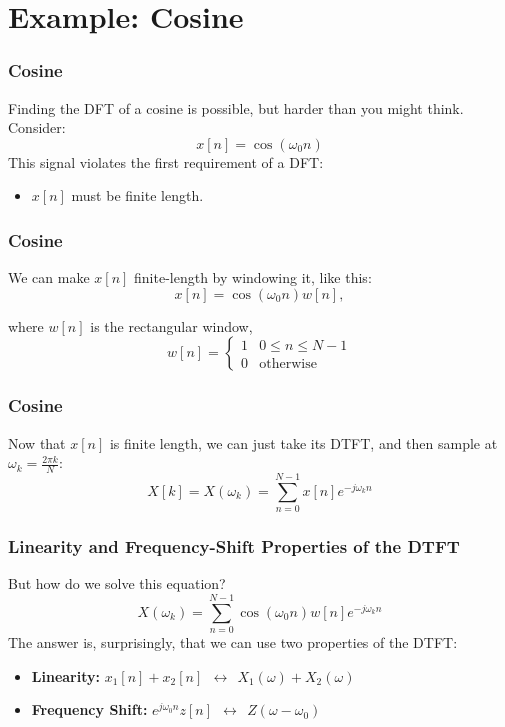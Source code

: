 \documentclass{beamer}
\begin{document}
\section[Cosine]{Example: Cosine}
\setcounter{subsection}{1}

\begin{frame}
  \frametitle{Cosine}

  Finding the DFT of a cosine is possible, but harder than you might think.
  Consider:
  \begin{displaymath}
    x[n] = \cos(\omega_0 n)
  \end{displaymath}
  This signal violates the first requirement of a DFT:
  \begin{itemize}
  \item $x[n]$ must be finite length.
  \end{itemize}
\end{frame}

\begin{frame}
  \frametitle{Cosine}

  We can make $x[n]$ finite-length by windowing it, like this:
  \begin{displaymath}
    x[n] = \cos(\omega_0 n)w[n],
  \end{displaymath}

  where $w[n]$ is the rectangular window,
  \begin{displaymath}
    w[n] =\begin{cases}
    1 & 0\le n \le N-1\\
    0 & \mbox{otherwise}
    \end{cases}
  \end{displaymath}
\end{frame}

\begin{frame}
  \frametitle{Cosine}

  Now that $x[n]$ is finite length, we can just take its DTFT, and
  then sample at $\omega_k=\frac{2\pi k}{N}$:
  \begin{displaymath}
    X[k] = X(\omega_k) = \sum_{n=0}^{N-1} x[n]e^{-j\omega_k n}
  \end{displaymath}

\end{frame}

\begin{frame}
  \frametitle{Linearity and Frequency-Shift Properties of the DTFT}

  But how do we solve this equation?
  \begin{displaymath}
    X(\omega_k) = \sum_{n=0}^{N-1} \cos(\omega_0 n)w[n] e^{-j\omega_k n}
  \end{displaymath}
  The answer is, surprisingly, that we can use two properties of the
  DTFT:
  \begin{itemize}
  \item {\bf Linearity:} $x_1[n]+x_2[n]~~\leftrightarrow~~X_1(\omega)+X_2(\omega)$
  \item {\bf Frequency Shift:} $e^{j\omega_0 n}z[n]~~\leftrightarrow~~Z(\omega-\omega_0)$
  \end{itemize}

\end{frame}
\end{document}
